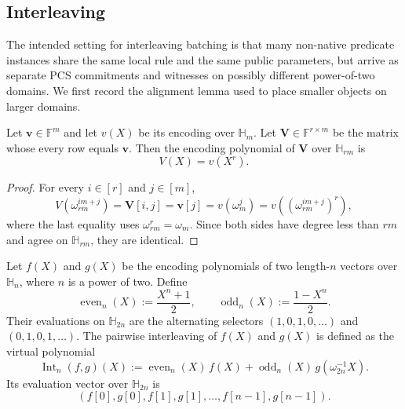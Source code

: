 \subsection{Interleaving}\label{app:interleaving}

The intended setting for interleaving batching is that many non-native
predicate instances share the same local rule and the same public parameters,
but arrive as separate
PCS commitments and witnesses on possibly different power-of-two domains.
We first record the alignment lemma
used to place smaller objects on larger domains.

\begin{lemma}
\label{lem:row-replication}
Let $\mathbf{v}\in\mathbb{F}^m$ and let $v(X)$ be its encoding over
$\mathbb{H}_m$. Let $\mathbf{V}\in\mathbb{F}^{r\times m}$ be the matrix whose
every row equals $\mathbf{v}$. Then the encoding polynomial of $\mathbf{V}$ over
$\mathbb{H}_{rm}$ is
\[
V(X)=v(X^r).
\]
\end{lemma}

\begin{proof}
For every $i\in[r]$ and $j\in[m]$,
\[
V(\omega_{rm}^{im+j})
= \mathbf{V}[i,j]
= \mathbf{v}[j]
= v(\omega_m^j)
= v((\omega_{rm}^{im+j})^r),
\]
where the last equality uses $\omega_{rm}^r=\omega_m$. Since both sides have
degree less than $rm$ and agree on $\mathbb{H}_{rm}$, they are identical.
\end{proof}

\begin{definition}
\label{def:pairwise-interleaving}
Let $f(X)$ and $g(X)$ be the encoding polynomials of two length-$n$ vectors
over $\mathbb{H}_n$, where $n$ is a power of two. Define
\[
\operatorname{even}_n(X):=\frac{X^n+1}{2},
\qquad
\operatorname{odd}_n(X):=\frac{1-X^n}{2}.
\]
Their evaluations on $\mathbb{H}_{2n}$ are the alternating selectors
$(1,0,1,0,\ldots)$ and $(0,1,0,1,\ldots)$. The pairwise interleaving of
$f(X)$ and $g(X)$ is defined as the virtual polynomial
\[
\operatorname{Int}_n(f,g)(X)
:=
\operatorname{even}_n(X)\,f(X)
+
\operatorname{odd}_n(X)\,g(\omega_{2n}^{-1}X).
\]
Its evaluation vector over $\mathbb{H}_{2n}$ is
\[
(f[0],g[0],f[1],g[1],\ldots,f[n-1],g[n-1]).
\]
\end{definition}

